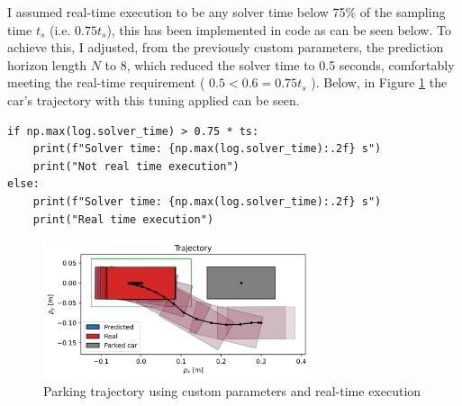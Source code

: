 \documentclass[]{article}
\begin{document}
\begin{flushleft}
	I assumed real-time execution to be any solver time below 75\% of the sampling time $t_s$ (i.e. $0.75 t_s$), this has been implemented in code as can be seen below. 
	To achieve this, I adjusted, from the previously custom parameters, the prediction horizon length $N$ to 8, which reduced the solver time to 0.5 seconds, comfortably meeting the real-time requirement ( $0.5 < 0.6 = 0.75 t_s$ ).
	Below, in Figure \ref{fig:assignment4_6} the car's trajectory with this tuning applied can be seen.
\end{flushleft}
\begin{lstlisting}[style=python]
if np.max(log.solver_time) > 0.75 * ts:
	print(f"Solver time: {np.max(log.solver_time):.2f} s")
	print("Not real time execution")
else:
	print(f"Solver time: {np.max(log.solver_time):.2f} s")
	print("Real time execution")
\end{lstlisting}
\begin{figure}[H]
    \centering
    \includegraphics[width=0.7\textwidth]{images/Assignment_46.png}
    \caption{Parking trajectory using custom parameters and real-time execution}
    \label{fig:assignment4_6}
\end{figure}



\newpage
\end{document}
